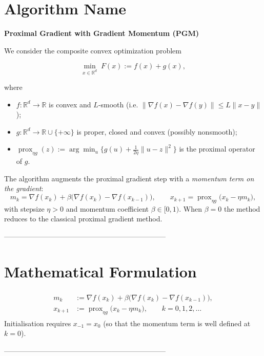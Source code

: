 \documentclass{article}
\newcommand{\prox}{\operatorname{prox}}
\newcommand{\R}{\mathbb{R}}
\begin{document}
\section*{Algorithm Name}
\textbf{Proximal Gradient with Gradient Momentum (PGM)}  

We consider the composite convex optimization problem  

\[
\min_{x\in\R^{d}} \;F(x):=f(x)+g(x),
\]

where  

\begin{itemize}
    \item $f:\R^{d}\!\to\!\R$ is convex and $L$‑smooth (i.e. $\|\nabla f(x)-\nabla f(y)\|\le L\|x-y\|$);
    \item $g:\R^{d}\!\to\!\R\cup\{+\infty\}$ is proper, closed and convex (possibly nonsmooth);
    \item $\prox_{\eta g}(z):=\arg\min_{u}\Big\{ g(u)+\frac1{2\eta}\|u-z\|^{2}\Big\}$ is the proximal operator of $g$.
\end{itemize}

The algorithm augments the proximal gradient step with a \emph{momentum term on the gradient}:
\[
m_{k}= \nabla f(x_{k})+\beta\bigl(\nabla f(x_{k})-\nabla f(x_{k-1})\bigr),\qquad
x_{k+1}= \prox_{\eta g}\bigl(x_{k}-\eta m_{k}\bigr),
\]
with stepsize $\eta>0$ and momentum coefficient $\beta\in[0,1)$.  
When $\beta=0$ the method reduces to the classical proximal gradient method.

--------------------------------------------------------------------

\section*{Mathematical Formulation}
\begin{align}
\boxed{
\begin{aligned}
m_{k} &:= \nabla f(x_{k})+\beta\bigl(\nabla f(x_{k})-\nabla f(x_{k-1})\bigr), \\
x_{k+1} &:= \prox_{\eta g}\!\bigl(x_{k}-\eta m_{k}\bigr),
\qquad k=0,1,2,\dots
\end{aligned}}
\end{align}
Initialisation requires $x_{-1}=x_{0}$ (so that the momentum term is well defined at $k=0$).

--------------------------------------------------------------------
\end{document}
